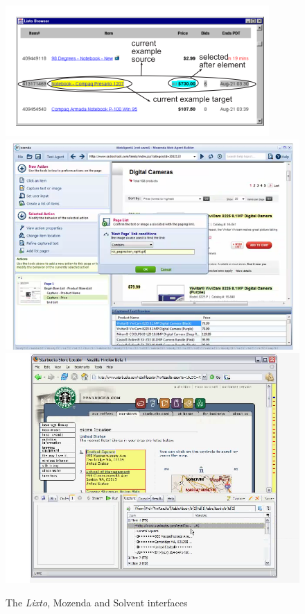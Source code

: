\begin{figure}[htbp]
\begin{center}
\includegraphics[scale=0.5]{lixto.png} 
\includegraphics[scale=0.25]{mozenda.png}
\\
\includegraphics[scale=0.25]{piggybank.png} 
\end{center}

\caption{The \textit{Lixto}, Mozenda and Solvent interfaces}
\label{fig:lixto}
\end{figure}

